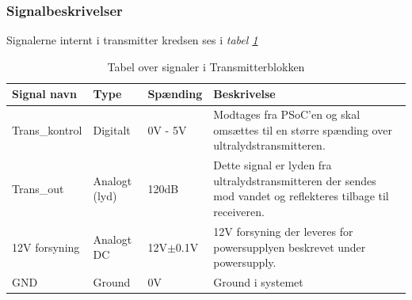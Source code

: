 \subsubsection{Signalbeskrivelser}
Signalerne internt i transmitter kredsen ses i \textit{tabel \ref{table:transmitterblok}}
\begin{table}[H]
\begin{tabular}{|p{3cm}|p{3cm}|p{3cm}|p{4.5cm}|} \hline
\cellcolor[gray]{0.85}Signal navn& \cellcolor[gray]{0.85}Type &\cellcolor[gray]{0.85}Spænding&\cellcolor[gray]{0.85}Beskrivelse\\ \hline
Trans\_kontrol & Digitalt & 0V - 5V & Modtages fra PSoC'en og skal omsættes til en større spænding over ultralydstransmitteren.\\ \hline
Trans\_out & Analogt (lyd) & 120dB & Dette signal er lyden fra ultralydstransmitteren der sendes mod vandet og reflekteres tilbage til receiveren. \\ \hline
12V forsyning & Analogt DC & 12V$\pm$0.1V & 12V forsyning der leveres for powersupplyen beskrevet under powersupply.\\ \hline
GND & Ground & 0V & Ground i systemet \\ \hline
\end{tabular}
\caption{Tabel over signaler i Transmitterblokken}
\label{table:transmitterblok}
\end{table}

